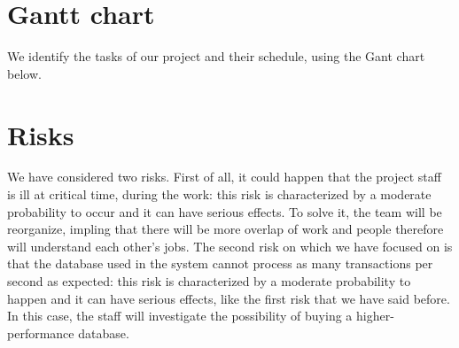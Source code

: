 \section{Gantt chart}
We identify the tasks of our project and their schedule, using the Gant chart below.
	

\section{Risks}
We have considered two risks. First of all, it could happen that the project staff is ill at critical time, during the work: this risk is characterized by a moderate probability to occur and it can have serious effects. To solve it, the team will be reorganize, impling that there will be more overlap of work and people therefore will understand each other's jobs.
The second risk on which we have focused on is that the database used in the system cannot process as many transactions per second as expected: this risk is characterized by a moderate probability to happen and it can have serious effects, like the first risk that we have said before. In this case, the staff will investigate the possibility of buying a higher-performance database.
	
